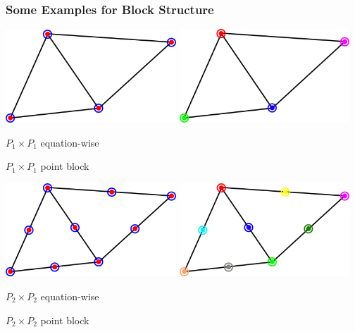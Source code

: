 \begin{frame}
\frametitle{Some Examples for Block Structure}
\begin{block}{}
\includegraphics[width=0.48\textwidth]{./EPS/P1P1}\hfill
\includegraphics[width=0.48\textwidth]{./EPS/P1P1b}

\begin{minipage}{0.48\textwidth}
\centering $P_1\times P_1$ equation-wise
\end{minipage}
\begin{minipage}{0.48\textwidth}
\centering $P_1\times P_1$ point block
\end{minipage}

\includegraphics[width=0.48\textwidth]{./EPS/P2P2}\hfill
\includegraphics[width=0.48\textwidth]{./EPS/P2P2b}

\begin{minipage}{0.48\textwidth}
\centering $P_2\times P_2$ equation-wise
\end{minipage}
\begin{minipage}{0.48\textwidth}
\centering $P_2\times P_2$ point block
\end{minipage}
\end{block}
\end{frame}


